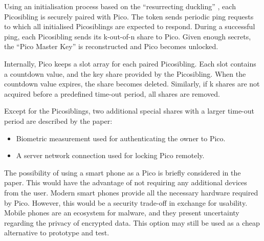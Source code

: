 Using an initialisation process based on the ``resurrecting duckling'' \cite{stajano2000resurrecting}, each Picosibling is securely paired with Pico. The token sends periodic ping requests to which all initialised Picosiblings are expected to respond. During a successful ping, each Picosibling sends its k-out-of-n share to Pico. Given enough secrets, the ``Pico Master Key'' is reconstructed and Pico becomes unlocked.

Internally, Pico keeps a slot array for each paired Picosibling. Each slot contains a countdown value, and the key share provided by the Picosibling. When the countdown value expires, the share becomes deleted. Similarly, if k shares are not acquired before a predefined time-out period, all shares are removed.

Except for the Picosiblings, two additional special shares with a larger time-out period are described by the paper:
\begin{itemize}
	\item Biometric measurement used for authenticating the owner to Pico.
	\item A server network connection used for locking Pico remotely.
\end{itemize}

The possibility of using a smart phone as a Pico is briefly considered in the paper. This would have the advantage of not requiring any additional devices from the user. Modern smart phones provide all the necessary hardware required by Pico. However, this would be a security trade-off in exchange for usability. Mobile phones are an ecosystem for malware, and they present uncertainty regarding the privacy of encrypted data. This option may still be used as a cheap alternative to prototype and test.








